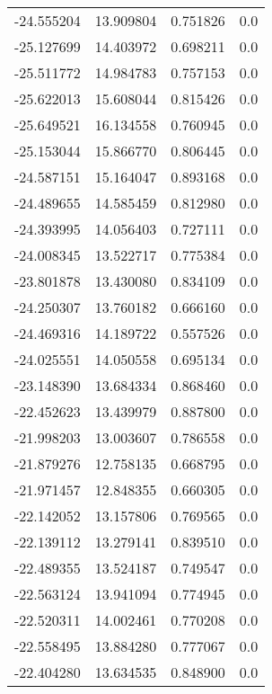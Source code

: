 \begin{tabular}{rrrr}
      -24.555204 &        13.909804 &    0.751826 &   0.0 \\
      -25.127699 &        14.403972 &    0.698211 &   0.0 \\
      -25.511772 &        14.984783 &    0.757153 &   0.0 \\
      -25.622013 &        15.608044 &    0.815426 &   0.0 \\
      -25.649521 &        16.134558 &    0.760945 &   0.0 \\
      -25.153044 &        15.866770 &    0.806445 &   0.0 \\
      -24.587151 &        15.164047 &    0.893168 &   0.0 \\
      -24.489655 &        14.585459 &    0.812980 &   0.0 \\
      -24.393995 &        14.056403 &    0.727111 &   0.0 \\
      -24.008345 &        13.522717 &    0.775384 &   0.0 \\
      -23.801878 &        13.430080 &    0.834109 &   0.0 \\
      -24.250307 &        13.760182 &    0.666160 &   0.0 \\
      -24.469316 &        14.189722 &    0.557526 &   0.0 \\
      -24.025551 &        14.050558 &    0.695134 &   0.0 \\
      -23.148390 &        13.684334 &    0.868460 &   0.0 \\
      -22.452623 &        13.439979 &    0.887800 &   0.0 \\
      -21.998203 &        13.003607 &    0.786558 &   0.0 \\
      -21.879276 &        12.758135 &    0.668795 &   0.0 \\
      -21.971457 &        12.848355 &    0.660305 &   0.0 \\
      -22.142052 &        13.157806 &    0.769565 &   0.0 \\
      -22.139112 &        13.279141 &    0.839510 &   0.0 \\
      -22.489355 &        13.524187 &    0.749547 &   0.0 \\
      -22.563124 &        13.941094 &    0.774945 &   0.0 \\
      -22.520311 &        14.002461 &    0.770208 &   0.0 \\
      -22.558495 &        13.884280 &    0.777067 &   0.0 \\
      -22.404280 &        13.634535 &    0.848900 &   0.0 \\

\end{tabular}
